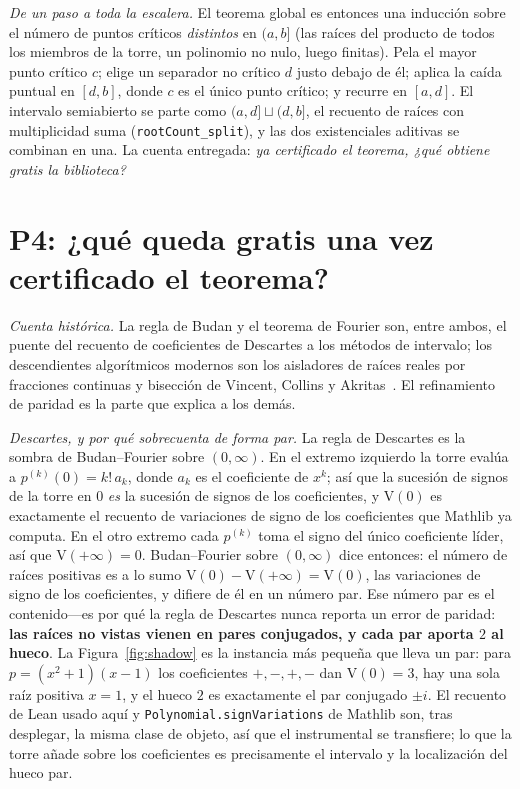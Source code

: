 \documentclass[11pt]{article}
\newcommand{\lean}[1]{\texttt{#1}}
\newcommand{\V}{\mathrm{V}}
\begin{document}
\emph{De un paso a toda la escalera.} El teorema global es entonces una inducci\'on sobre el n\'umero de
puntos cr\'iticos \emph{distintos} en $(a,b]$ (las ra\'ices del producto de todos los miembros de la
torre, un polinomio no nulo, luego finitas). Pela el mayor punto cr\'itico $c$; elige un separador no
cr\'itico $d$ justo debajo de \'el; aplica la ca\'ida puntual en $[d,b]$, donde $c$ es el \'unico punto
cr\'itico; y recurre en $[a,d]$. El intervalo semiabierto se parte como $(a,d]\sqcup(d,b]$, el recuento
de ra\'ices con multiplicidad suma (\lean{rootCount\_split}), y las dos existenciales aditivas se
combinan en una. La cuenta entregada: \emph{ya certificado el teorema, ¿qu\'e obtiene gratis la
biblioteca?}

\section{P4: ¿qu\'e queda gratis una vez certificado el teorema?}\label{sec:q4}

\emph{Cuenta hist\'orica.} La regla de Budan y el teorema de Fourier son, entre ambos, el puente del
recuento de coeficientes de Descartes a los m\'etodos de intervalo; los descendientes algor\'itmicos
modernos son los aisladores de ra\'ices reales por fracciones continuas y bisecci\'on de Vincent,
Collins y Akritas~\cite{vincent,collinsakritas}. El refinamiento de paridad es la parte que explica a
los dem\'as.

\emph{Descartes, y por qu\'e sobrecuenta de forma par.} La regla de Descartes es la sombra de
Budan--Fourier sobre $(0,\infty)$. En el extremo izquierdo la torre eval\'ua a $p^{(k)}(0)=k!\,a_k$,
donde $a_k$ es el coeficiente de $x^k$; as\'i que la sucesi\'on de signos de la torre en $0$ \emph{es}
la sucesi\'on de signos de los coeficientes, y $\V(0)$ es exactamente el recuento de variaciones de
signo de los coeficientes que Mathlib ya computa. En el otro extremo cada $p^{(k)}$ toma el signo del
\'unico coeficiente l\'ider, as\'i que $\V(+\infty)=0$. Budan--Fourier sobre $(0,\infty)$ dice
entonces: el n\'umero de ra\'ices positivas es a lo sumo $\V(0)-\V(+\infty)=\V(0)$, las variaciones de
signo de los coeficientes, y difiere de \'el en un n\'umero par. Ese n\'umero par es el contenido---es
por qu\'e la regla de Descartes nunca reporta un error de paridad: \textbf{las ra\'ices no vistas vienen
en pares conjugados, y cada par aporta $2$ al hueco}. La Figura~\ref{fig:shadow} es la instancia m\'as
peque\~na que lleva un par: para $p=(x^2+1)(x-1)$ los coeficientes $+,-,+,-$ dan $\V(0)=3$, hay una sola
ra\'iz positiva $x=1$, y el hueco $2$ es exactamente el par conjugado $\pm i$. El recuento de Lean usado
aqu\'i y \lean{Polynomial.signVariations} de Mathlib son, tras desplegar, la misma clase de objeto, as\'i
que el instrumental se transfiere; lo que la torre a\~nade sobre los coeficientes es precisamente el
intervalo y la localizaci\'on del hueco par.
\end{document}
